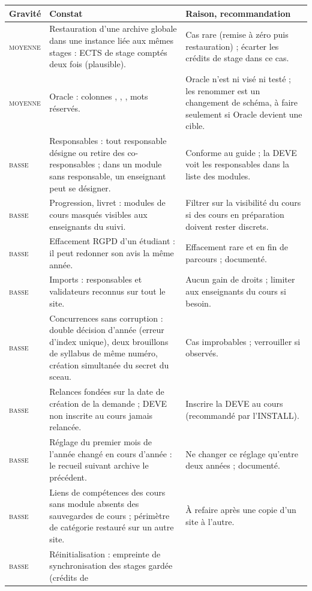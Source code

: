 \documentclass[11pt,a4paper]{article}
\newcommand{\code}[1]{\texttt{\detokenize{#1}}}
\newcommand{\grav}[1]{\textsc{#1}}
\begin{document}
\begin{xltabular}{\linewidth}{@{}l X X@{}}
\toprule
\textbf{Gravité} & \textbf{Constat} & \textbf{Raison, recommandation} \\
\midrule
\endhead
\grav{moyenne} & Restauration d'une archive globale dans une instance liée aux mêmes stages :
ECTS de stage comptés deux fois (plausible). & Cas rare (remise à zéro puis restauration) ;
écarter les crédits de stage dans ce cas. \\
\grav{moyenne} & Oracle : colonnes \code{comment}, \code{number}, \code{level}, mots réservés. &
Oracle n'est ni visé ni testé ; les renommer est un changement de schéma, à faire seulement si
Oracle devient une cible. \\
\grav{basse} & Responsables : tout responsable désigne ou retire des co-responsables ; dans un
module sans responsable, un enseignant peut se désigner. & Conforme au guide ; la DEVE voit les
responsables dans la liste des modules. \\
\grav{basse} & Progression, livret : modules de cours masqués visibles aux enseignants du
suivi. & Filtrer sur la visibilité du cours si des cours en préparation doivent rester
discrets. \\
\grav{basse} & Effacement RGPD d'un étudiant : il peut redonner son avis la même année. &
Effacement rare et en fin de parcours ; documenté. \\
\grav{basse} & Imports : responsables et validateurs reconnus sur tout le site. & Aucun gain de
droits ; limiter aux enseignants du cours si besoin. \\
\grav{basse} & Concurrences sans corruption : double décision d'année (erreur d'index unique),
deux brouillons de syllabus de même numéro, création simultanée du secret du sceau. & Cas
improbables ; verrouiller si observés. \\
\grav{basse} & Relances fondées sur la date de création de la demande ; DEVE non inscrite au
cours jamais relancée. & Inscrire la DEVE au cours (recommandé par l'INSTALL). \\
\grav{basse} & Réglage du premier mois de l'année changé en cours d'année : le recueil suivant
archive le précédent. & Ne changer ce réglage qu'entre deux années ; documenté. \\
\grav{basse} & Liens de compétences des cours sans module absents des sauvegardes de cours ;
périmètre de catégorie restauré sur un autre site. & À refaire après une copie d'un site à
l'autre. \\
\grav{basse} & Réinitialisation : empreinte de synchronisation des stages gardée (crédits de

\end{xltabular}
\end{document}
